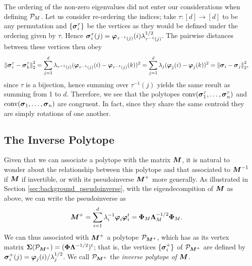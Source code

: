 \begin{remark}
	The ordering of the non-zero eigenvalues did not enter our considerations when defining $\P_M$. Let us consider re-ordering the indices; take $\tau:[d]\to[d]$ to be any permutation and $\{\sv_i^\tau\}$ be the vertices as they would be defined under the ordering given by $\tau$. Hence $\sv_i^\tau(j) = \vp_{\tau^{-1}(j)}(i)\lambda_{\tau^{-1}(j)}^{1/2}$. The pairwise distances between these vertices then obey 
	\begin{equation*}
	\norm{\sv_i^\tau-\sv_k^\tau}_2^2 = \sum_{j=1}^d \lambda_{\tau^{-1}(j)} (\vp_{\tau^{-1}(j)}(i)-\vp_{\tau^{-1}(j)}(k))^2 = \sum_{j=1}^d \lambda_{j} (\vp_{j}(i)-\vp_{j}(k))^2 = \norm{\sv_i-\sv_j}_2^2,
	\end{equation*}
	since $\tau$ is a bijection, hence summing over $\tau^{-1}(j)$ yields the same result as summing from 1 to $d$. 
	Therefore, we see that the polytopes $\conv(\sv_1^\tau,\dots,\sv_n^\tau)$ and  $\conv(\sv_1,\dots,\sv_n)$ are congruent. In fact, since they share the same centroid they are simply rotations of one another. 
\end{remark}


\subsection{The Inverse Polytope} 
\label{sec:inverse_polytope}
Given that we can associate a polytope with the matrix $\M$, it is natural to wonder about the relationship between this polytope and that associated to $\M^{-1}$ if $\M$ if invertible, or with its pseudoinverse $\M^+$ more generally. As illustrated in Section \ref{sec:background_pseudoinverse}, with the eigendecompition of $\M$ as above, we can write  the pseudoinverse as 
\[\M^+=\sum_{i=1}^d \lambda_i^{-1} \eig_i\eig_i^\tp = \Eig_M \Eval_M^{-1/2}\Eig_M.\]
We can thus associated with $\M^+$ a polytope $\pol_{\M^+}$, which has as its vertex matrix $\Sv(\pol_{\M^+})=(\Eig\Eval^{-1/2})^\tp$; that is, the vertices $\{\sv_i^+\}$ of $\pol_{\M^+}$ are defined by 
$\sv_i^+(j)=\eig_j(i)/\lambda_j^{1/2}$. We call $\pol_{\M^+}$ the \emph{inverse polytope of $\M$}. 

